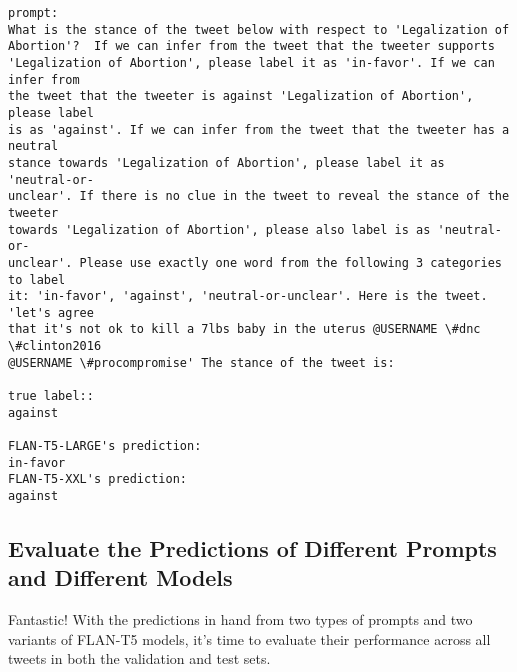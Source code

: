 \documentclass[11pt]{article}
\begin{document}
    \begin{Verbatim}[commandchars=\\\{\}]
prompt:
What is the stance of the tweet below with respect to 'Legalization of
Abortion'?  If we can infer from the tweet that the tweeter supports
'Legalization of Abortion', please label it as 'in-favor'. If we can infer from
the tweet that the tweeter is against 'Legalization of Abortion', please label
is as 'against'. If we can infer from the tweet that the tweeter has a neutral
stance towards 'Legalization of Abortion', please label it as 'neutral-or-
unclear'. If there is no clue in the tweet to reveal the stance of the tweeter
towards 'Legalization of Abortion', please also label is as 'neutral-or-
unclear'. Please use exactly one word from the following 3 categories to label
it: 'in-favor', 'against', 'neutral-or-unclear'. Here is the tweet. 'let's agree
that it's not ok to kill a 7lbs baby in the uterus @USERNAME \#dnc \#clinton2016
@USERNAME \#procompromise' The stance of the tweet is:

true label::
against

FLAN-T5-LARGE's prediction:
in-favor
FLAN-T5-XXL's prediction:
against
    \end{Verbatim}

    \hypertarget{evaluate-the-predictions-of-different-prompts-and-different-models}{%
\subsection{Evaluate the Predictions of Different Prompts and Different
Models}\label{evaluate-the-predictions-of-different-prompts-and-different-models}}

    Fantastic! With the predictions in hand from two types of prompts and
two variants of FLAN-T5 models, it's time to evaluate their performance
across all tweets in both the validation and test sets.
\end{document}
